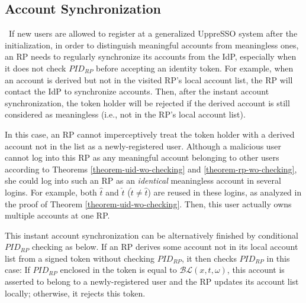 \subsection{Account Synchronization}
\
If new users are allowed to register at a generalized UppreSSO system after the initialization,
in order to distinguish meaningful accounts from meaningless ones,
 an RP needs to regularly synchronize its accounts from the IdP,
 especially when it does not check $PID_{RP}$ before accepting an identity token.
For example,
    when an account is derived but not in the visited RP's local account list,
        the RP will contact the IdP to synchronize accounts.
Then, after the instant account synchronization, 
    the token holder will be rejected
     if the derived account is still considered as meaningless (i.e., not in the RP's local account list).

In this case, an RP cannot imperceptively treat the token holder with a derived account not in the list
 as a newly-registered user.
Although a malicious user cannot log into this RP as any meaningful account belonging to other users according to Theorems \ref{theorem-uid-wo-checking} and \ref{theorem-rp-wo-checking},
 she could log into such an RP as an \emph{identical} meaningless account in several logins.
For example, both $\hat{t}$ and $\check{t}$ ($\check{t} \neq \hat{t}$) are reused in these logins,
    as analyzed in the proof of Theorem \ref{theorem-uid-wo-checking}.
Then, this user actually owns multiple accounts at one RP.


This instant account synchronization can be alternatively finished by conditional $PID_{RP}$ checking as below.
If an RP derives some account not in its local account list from a signed token without checking $PID_{RP}$,
    it then checks $PID_{RP}$ in this case:
     If $PID_{RP}$ enclosed in the token is equal to $\mathcal{BL}(x,t,\omega)$,
                this account is asserted to belong to a newly-registered user
                and the RP updates its account list locally;
    otherwise, it rejects this token.


